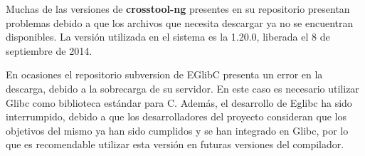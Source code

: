 \documentclass{article}
\begin{document}
Muchas de las versiones de \textbf{crosstool-ng} presentes en su repositorio presentan problemas debido a que los archivos que necesita descargar ya no se encuentran disponibles. La versión utilizada en el sistema es la 1.20.0, liberada el 8 de septiembre de 2014.

En ocasiones el repositorio subversion de EGlibC presenta un error en la descarga, debido a la sobrecarga de su servidor. En este caso es necesario utilizar Glibc como biblioteca estándar para C. Además, el desarrollo de Eglibc ha sido interrumpido, debido a que los desarrolladores del proyecto consideran que los objetivos del mismo ya han sido cumplidos y se han integrado en Glibc, por lo que es recomendable utilizar esta versión en futuras versiones del compilador.




\nocite{bootccrosstool}
\nocite{pointcloudscrosstool}
\nocite{linuxjournaldistcc}
\nocite{distccreference}
\nocite{distccfaq}
\nocite{jeremynicolacrosstool}
\nocite{mborgersoncrosstool}

\label{Bibliography}
\end{document}
